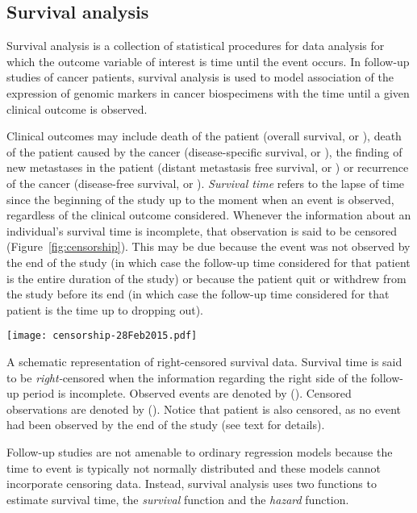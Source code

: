 \subsection{Survival analysis}
\label{sec:methods-survival-analysis}

Survival analysis is a collection of statistical procedures for data analysis
for which the outcome variable of interest is time until the event
occurs.\cite{kleinbaum_survival_1996} In follow-up studies of cancer patients,
survival analysis is used to model association of the expression of genomic
markers in cancer biospecimens with the time until a given clinical outcome is
observed.

Clinical outcomes may include death of the patient (overall survival, or
), death of the patient caused by the cancer (disease-specific
survival, or ), the finding of new metastases in the patient
(distant metastasis free survival, or ) or recurrence of the
cancer (disease-free survival, or ).  \emph{Survival time} refers
to the lapse of time since the beginning of the study up to the moment when an
event is observed, regardless of the clinical outcome considered.  Whenever the
information about an individual's survival time is incomplete, that observation
is said to be censored (Figure~\ref{fig:censorship}).  This may be due because
the event was not observed by the end of the study (in which case the follow-up
time considered for that patient is the entire duration of the study) or because
the patient quit or withdrew from the study before its end (in which case the
follow-up time considered for that patient is the time up to dropping out).

\begin{marginfigure}[-5cm]%
  \texttt{[image: censorship-28Feb2015.pdf]}
  \caption[Right-censored survival data]{A schematic representation of
    right-censored survival data.  Survival time is said to be
    \emph{right-}censored when the information regarding the right side of the
    follow-up period is incomplete.  Observed events are denoted by (\CIRCLE).
    Censored observations are denoted by (\Circle).  Notice that patient
     is also censored, as no event had been observed by the end
    of the study (see text for details).}\label{fig:censorship}%
\end{marginfigure}

Follow-up studies are not amenable to ordinary regression models because the
time to event is typically not normally distributed and these models cannot
incorporate censoring data.  Instead, survival analysis uses two functions to
estimate survival time, the \emph{survival} function and the \emph{hazard}
function.

